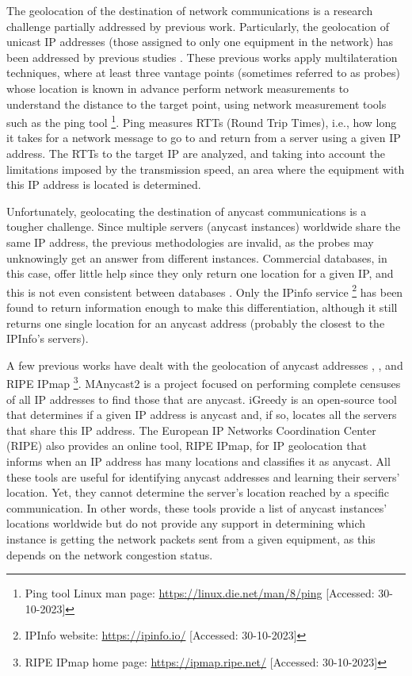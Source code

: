 \documentclass[preprint,12pt]{elsarticle}
\begin{document}
The geolocation of the destination of network communications is a research challenge partially addressed by previous work. Particularly, the geolocation of unicast IP addresses (those assigned to only one equipment in the network) has been addressed by previous studies \cite{Dan2021IPInterpolation, Ciavarrini2018GeolocationBound, Kohls2022VerLoc:Systems}. These previous works apply multilateration techniques, where at least three vantage points (sometimes referred to as probes) whose location is known in advance perform network measurements to understand the distance to the target point, using network measurement tools such as the ping tool \footnote{Ping tool Linux man page: \url{https://linux.die.net/man/8/ping} [Accessed: 30-10-2023]}. Ping measures RTTs (Round Trip Times), i.e., how long it takes for a network message to go to and return from a server using a given IP address. The RTTs to the target IP are analyzed, and taking into account the limitations imposed by the transmission speed, an area where the equipment with this IP address is located is determined.

Unfortunately, geolocating the destination of anycast communications is a tougher challenge. Since multiple servers (anycast instances) worldwide share the same IP address, the previous methodologies are invalid, as the probes may unknowingly get an answer from different instances. Commercial databases, in this case, offer little help since they only return one location for a given IP, and this is not even consistent between databases \cite{Cozar2022ReliabilityTransfers}. Only the IPinfo service \footnote{IPInfo website: \url{https://ipinfo.io/} [Accessed: 30-10-2023]} has been found to return information enough to make this differentiation, although it still returns one single location for an anycast address (probably the closest to the IPInfo's servers).

A few previous works have dealt with the geolocation of anycast addresses \cite{Sommese2020MAnycast2:Anycast}, \cite{Cicalese2015AGeolocation}, and RIPE IPmap \footnote{RIPE IPmap home page: \url{https://ipmap.ripe.net/} [Accessed: 30-10-2023]}. MAnycast2 \cite{Sommese2020MAnycast2:Anycast} is a project focused on performing complete censuses of all IP addresses to find those that are anycast. iGreedy \cite{Cicalese2015AGeolocation} is an open-source tool that determines if a given IP address is anycast and, if so, locates all the servers that share this IP address. The European IP Networks Coordination Center (RIPE) also provides an online tool, RIPE IPmap, for IP geolocation that informs when an IP address has many locations and classifies it as anycast. All these tools are useful for identifying anycast addresses and learning their servers' location. Yet, they cannot determine the server's location reached by a specific communication. In other words, these tools provide a list of anycast instances' locations worldwide but do not provide any support in determining which instance is getting the network packets sent from a given equipment, as this depends on the network congestion status. 
\end{document}
